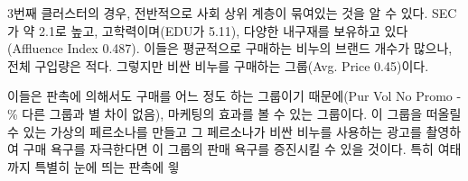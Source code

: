 \documentclass[11pt]{article}
\begin{document}
    3번째 클러스터의 경우, 전반적으로 사회 상위 계층이 묶여있는 것을 알 수
있다. SEC가 약 2.1로 높고, 고학력이며(EDU가 5.11), 다양한 내구재를
보유하고 있다(Affluence Index 0.487). 이들은 평균적으로 구매하는 비누의
브랜드 개수가 많으나, 전체 구입량은 적다. 그렇지만 비싼 비누를 구매하는
그룹(Avg. Price 0.45)이다.

이들은 판촉에 의해서도 구매를 어느 정도 하는 그룹이기 때문에(Pur Vol No
Promo - \% 다른 그룹과 별 차이 없음), 마케팅의 효과를 볼 수 있는
그룹이다. 이 그룹을 떠올릴 수 있는 가상의 페르소나를 만들고 그
페르소나가 비싼 비누를 사용하는 광고를 촬영하여 구매 욕구를 자극한다면
이 그룹의 판매 욕구를 증진시킬 수 있을 것이다. 특히 여태까지 특별히 눈에
띄는 판촉에 읳


    
    
    
    
\end{document}

